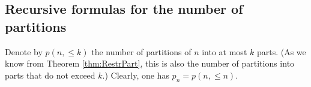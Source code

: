 

\setcounter{section}{3}
\setcounter{subsection}{7}
\setcounter{dfn}{16}

\subsection{Recursive formulas for the number of partitions}
Denote by $p(n, \le k)$ the number of partitions of $n$ into at most $k$ parts.
(As we know from Theorem \ref{thm:RestrPart}, this is also the number of partitions into parts that do not exceed $k$.)
Clearly, one has $p_n = p(n, \le n)$.



